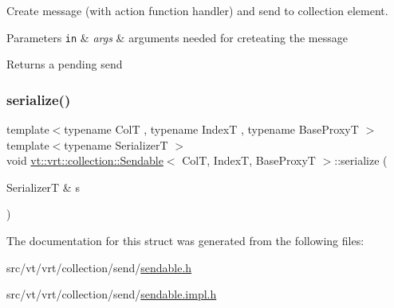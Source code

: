Create message (with action function handler) and send to collection element. 


\begin{DoxyParams}[1]{Parameters}
\mbox{\tt in}  & {\em args} & arguments needed for creteating the message\\
\hline
\end{DoxyParams}
\begin{DoxyReturn}{Returns}
a pending send 
\end{DoxyReturn}
\mbox{\label{structvt_1_1vrt_1_1collection_1_1_sendable_ae8e7cff31e30aa7cda6b958c1a81ddc3}} 
\subsubsection{\texorpdfstring{serialize()}{serialize()}}
{\footnotesize\ttfamily template$<$typename ColT , typename IndexT , typename Base\+ProxyT $>$ \\
template$<$typename SerializerT $>$ \\
void \hyperlink{structvt_1_1vrt_1_1collection_1_1_sendable}{vt\+::vrt\+::collection\+::\+Sendable}$<$ ColT, IndexT, Base\+ProxyT $>$\+::serialize (\begin{DoxyParamCaption}\item[{SerializerT \&}]{s }\end{DoxyParamCaption})}



The documentation for this struct was generated from the following files\+:\begin{DoxyCompactItemize}
\item 
src/vt/vrt/collection/send/\hyperlink{sendable_8h}{sendable.\+h}\item 
src/vt/vrt/collection/send/\hyperlink{sendable_8impl_8h}{sendable.\+impl.\+h}\end{DoxyCompactItemize}
